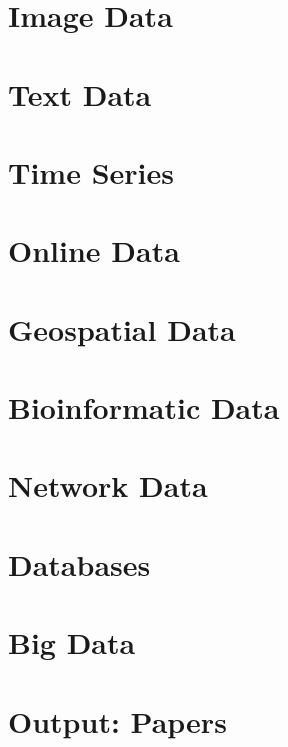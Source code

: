 \documentclass[
]{article}
\theoremstyle{definition}
\theoremstyle{definition}
\theoremstyle{definition}
\theoremstyle{definition}
\theoremstyle{remark}
\begin{document}
\hypertarget{image-data}{%
\section{Image Data}\label{image-data}}

\hypertarget{text-data}{%
\section{Text Data}\label{text-data}}

\hypertarget{time-series}{%
\section{Time Series}\label{time-series}}

\hypertarget{online-data}{%
\section{Online Data}\label{online-data}}

\hypertarget{geospatial-data}{%
\section{Geospatial Data}\label{geospatial-data}}

\hypertarget{bioinformatic-data}{%
\section{Bioinformatic Data}\label{bioinformatic-data}}

\hypertarget{network-data}{%
\section{Network Data}\label{network-data}}

\hypertarget{databases}{%
\section{Databases}\label{databases}}

\hypertarget{big-data}{%
\section{Big Data}\label{big-data}}

\hypertarget{output-papers}{%
\section{Output: Papers}\label{output-papers}}
\end{document}
